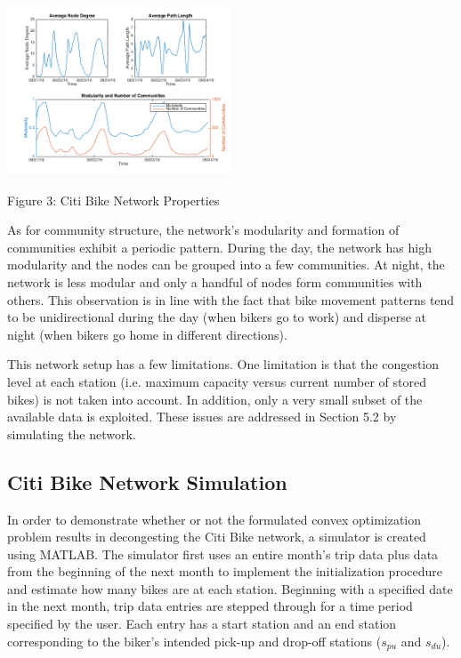 \documentclass[times, 10pt,twocolumn]{article}
\begin{document}
\centerline{\includegraphics[width=0.5\textwidth]{m4/plotterfigure.png}}
\centerline{Figure 3: Citi Bike Network Properties}
\hfill \break
\indent As for community structure, the network's modularity and formation of communities exhibit a periodic pattern. During the day, the network has high modularity and the nodes can be grouped into a few communities. At night, the network is less modular and only a handful of nodes form communities with others. This observation is in line with the fact that bike movement patterns tend to be unidirectional during the day (when bikers go to work) and disperse at night (when bikers go home in different directions).

This network setup has a few limitations. One limitation is that the congestion level at each station (i.e. maximum capacity versus current number of stored bikes) is not taken into account. In addition, only a very small subset of the available data is exploited. These issues are addressed in Section 5.2 by simulating the network.

\subsection{Citi Bike Network Simulation}

In order to demonstrate whether or not the formulated convex optimization problem results in decongesting the Citi Bike network, a simulator is created using MATLAB. The simulator first uses an entire month's trip data plus data from the beginning of the next month to implement the initialization procedure and estimate how many bikes are at each station. Beginning with a specified date in the next month, trip data entries are stepped through for a time period specified by the user. Each entry has a start station and an end station corresponding to the biker's intended pick-up and drop-off stations ($s_{pu}$ and $s_{du}$).
\end{document}
